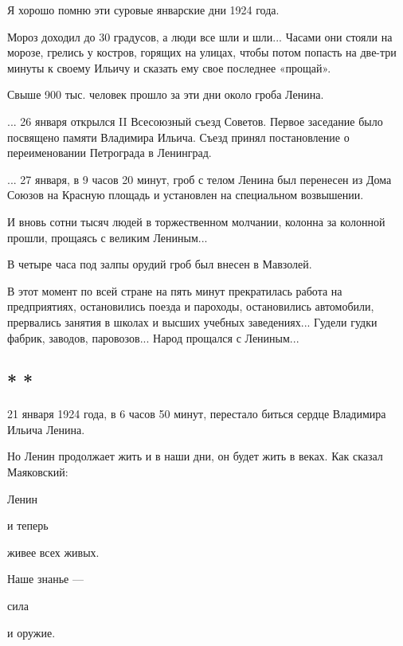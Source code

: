 \documentclass[12pt, a4paper, openany]{book}
\begin{document}
Я хорошо помню эти суровые январские дни 1924 года.

Мороз доходил до 30 градусов, а люди все шли и шли... Часами они стояли на морозе, грелись у костров, горящих на улицах, чтобы потом попасть на две-три минуты к своему Ильичу и сказать ему свое последнее «прощай».

Свыше 900 тыс. человек прошло за эти дни около гроба Ленина.

... 26 января открылся II Всесоюзный съезд Советов. Первое заседание было посвящено памяти Владимира Ильича. Съезд принял постановление о переименовании Петрограда в Ленинград.

... 27 января, в 9 часов 20 минут, гроб с телом Ленина был перенесен из Дома Союзов на Красную площадь и установлен на специальном возвышении.

И вновь сотни тысяч людей в торжественном молчании, колонна за колонной прошли, прощаясь с великим Лениным...

В четыре часа под залпы орудий гроб был внесен в Мавзолей.

В этот момент по всей стране на пять минут прекратилась работа на предприятиях, остановились поезда и пароходы, остановились автомобили, прервались занятия в школах и высших учебных заведениях... Гудели гудки фабрик, заводов, паровозов... Народ прощался с Лениным...

\subsection*{\center * * *}

21 января 1924 года, в 6 часов 50 минут, перестало биться сердце Владимира Ильича Ленина.

Но Ленин продолжает жить и в наши дни, он будет жить в веках. Как сказал Маяковский:

\quad \quad \quad \quad \quad \quad \quad \quad Ленин

\quad \quad \quad \quad \quad \quad \quad \quad \quad \quad \quad и теперь

\quad \quad \quad \quad \quad \quad \quad \quad \quad \quad \quad \quad \quad \quad живее всех живых.

\quad \quad \quad \quad \quad \quad \quad \quad Наше знанье —

\quad \quad \quad \quad \quad \quad \quad \quad \quad \quad \quad \quad \quad \quad сила

\quad \quad \quad \quad \quad \quad \quad \quad \quad \quad \quad \quad \quad \quad \quad \quad и оружие.
\end{document}
